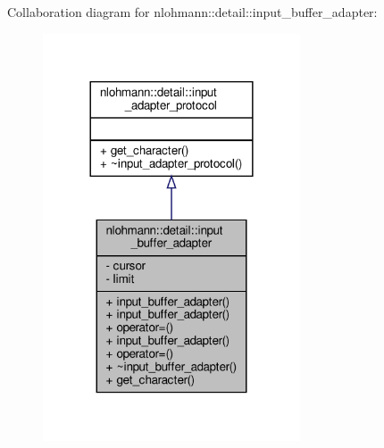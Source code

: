 Collaboration diagram for nlohmann\+:\+:detail\+:\+:input\+\_\+buffer\+\_\+adapter\+:
\nopagebreak
\begin{figure}[H]
\begin{center}
\leavevmode
\includegraphics[width=216pt]{classnlohmann_1_1detail_1_1input__buffer__adapter__coll__graph}
\end{center}
\end{figure}
